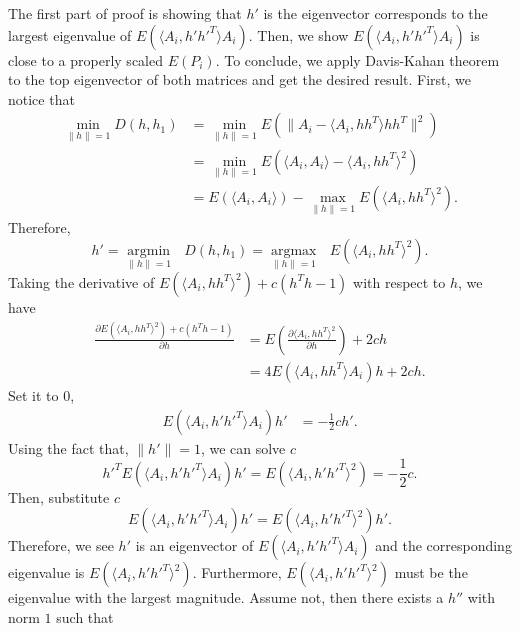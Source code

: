 \documentclass[10pt,journal,compsoc]{IEEEtran}
\newenvironment{proof}[1][Proof]{\begin{trivlist}
		\item[\hskip \labelsep {\bfseries #1}]}{\end{trivlist}}
\begin{document}
\begin{proof} [Proof of Theorem 4.2]
The first part of proof is showing that $h'$ is the eigenvector corresponds to the largest eigenvalue of $E(\langle A_{i},h' h'^T \rangle A_{i})$. Then, we show $E(\langle A_{i},h' h'^T \rangle A_{i})$ is close to a properly scaled $E(P_i)$. To conclude, we apply Davis-Kahan theorem to the top eigenvector of both matrices and get the desired result. First, we notice that
	\begin{align*}
	\underset{\|h\| =1}{\operatorname{min}}D(h,h_1) &=\underset{\|h\| =1}{\operatorname{min}}E(\|A_i- \langle A_i,h h^T \rangle h h^T\|^2) \\
	&=\underset{\|h\| =1}{\operatorname{min}}E(\langle A_i,A_i \rangle- \langle A_i,h h^T \rangle ^2) \\
	&=E(\langle A_i,A_i \rangle)-\underset{\|h\| =1}{\operatorname{max}}E( \langle A_i,h h^T \rangle ^2).
	\end{align*}
	Therefore, 
	\begin{equation} \label{eq:5}
	h'= \underset{\|h\| =1}{\operatorname{argmin}} \text{ }D(h,h_1)=\underset{\|h\| =1}{\operatorname{argmax}} \text{ } E(\langle A_i,h h^T \rangle ^2) .
	\end{equation}
	Taking the derivative of $E( \langle A_i,h h^T \rangle ^2)+ c(h^Th-1)$ with respect to $h$, we have 
	\begin{align*}
	\frac{\partial E( \langle A_i,h h^T \rangle ^2)+ c(h^Th-1) }{\partial h} & =  E(\frac{\partial  \langle A_i,h h^T \rangle ^2}{\partial h}) +2ch \\
	&=4 E( \langle A_i,h h^T \rangle A_i)h +2ch .
	\end{align*}
	Set it to $0$,
	\begin{align*} 
	E( \langle A_i,h' h'^T \rangle A_i)h' & = -\frac{1}{2}ch' .
	\end{align*}
	Using the fact that, $\|h'\|=1$, we can solve $c$
	\[ h'^T E( \langle A_i,h' h'^T \rangle A_i)h' = E( \langle A_i,h' h'^T \rangle^2)= -\frac{1}{2}c .\]
	Then, substitute $c$
	\begin{equation}
	E( \langle A_i,h' h'^T \rangle A_i)h'=E( \langle A_i,h' h'^T \rangle^2)h'.
	\end{equation}
	Therefore, we see $h'$ is an eigenvector of $E(\langle A_{i},h' h'^T \rangle A_{i})$ and the corresponding eigenvalue is $E(\langle A_{i},h' h'^T \rangle ^2)$. Furthermore, $E(\langle A_{i},h' h'^T \rangle ^2)$ must be the eigenvalue with the largest magnitude. Assume not, then there exists a $h''$ with norm $1$ such that

\end{proof}
\end{document}
